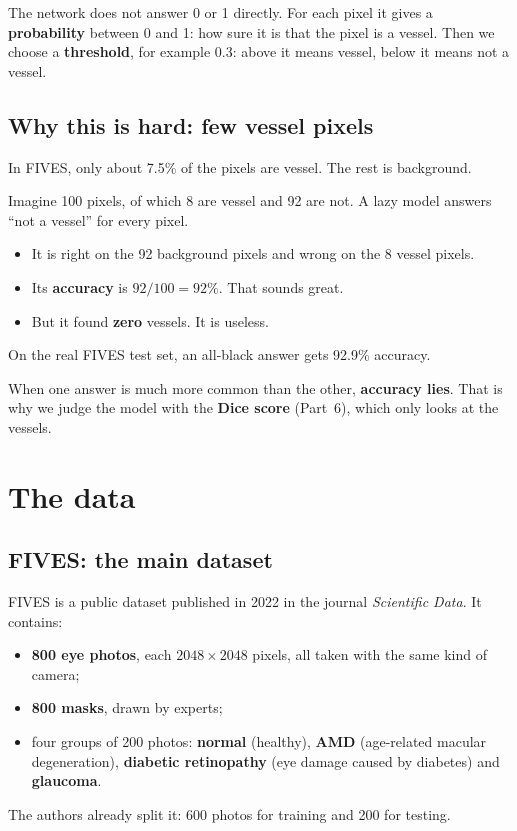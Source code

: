 \documentclass[11pt,a4paper]{article}
\begin{document}
The network does not answer 0 or 1 directly. For each pixel it gives a \textbf{probability} between 0 and 1: how sure it is that the pixel is a vessel. Then we choose a \textbf{threshold}, for example 0.3: above it means vessel, below it means not a vessel.

\subsection{Why this is hard: few vessel pixels}
In FIVES, only about 7.5\% of the pixels are vessel. The rest is background.

\begin{example}
Imagine 100 pixels, of which 8 are vessel and 92 are not. A lazy model answers ``not a vessel'' for every pixel.
\begin{itemize}
  \item It is right on the 92 background pixels and wrong on the 8 vessel pixels.
  \item Its \textbf{accuracy} is $92/100 = 92\%$. That sounds great.
  \item But it found \textbf{zero} vessels. It is useless.
\end{itemize}
On the real FIVES test set, an all-black answer gets 92.9\% accuracy.
\end{example}

\begin{remember}
When one answer is much more common than the other, \textbf{accuracy lies}. That is why we judge the model with the \textbf{Dice score} (Part~6), which only looks at the vessels.
\end{remember}

\section{The data}

\subsection{FIVES: the main dataset}
FIVES is a public dataset published in 2022 in the journal \emph{Scientific Data}. It contains:
\begin{itemize}
  \item \textbf{800 eye photos}, each $2048\times2048$ pixels, all taken with the same kind of camera;
  \item \textbf{800 masks}, drawn by experts;
  \item four groups of 200 photos: \textbf{normal} (healthy), \textbf{AMD} (age-related macular degeneration), \textbf{diabetic retinopathy} (eye damage caused by diabetes) and \textbf{glaucoma}.
\end{itemize}
The authors already split it: 600 photos for training and 200 for testing.
\end{document}
